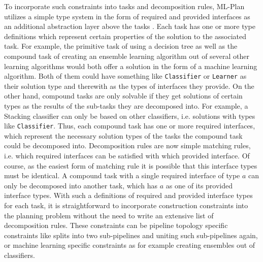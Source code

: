 To incorporate such constraints into tasks and decomposition rules, ML-Plan utilizes a simple type system in the form of required and provided interfaces as an additional abstraction layer above the tasks .
Each task has one or more type definitions which represent certain properties of the solution to the associated task.
For example, the primitive task of using a decision tree as well as the compound task of creating an ensemble learning algorithm out of several other learning algorithms would both offer a solution in the form of a machine learning algorithm.
Both of them could have something like \texttt{Classifier} or \texttt{Learner} as their solution type and therewith as the types of interfaces they provide.\newline
On the other hand, compound tasks are only solvable if they get solutions of certain types as the results of the sub-tasks they are decomposed into.
For example, a Stacking classifier can only be based on other classifiers, i.e. solutions with types like \texttt{Classifier}.
Thus, each compound task has one or more required interfaces, which represent the necessary solution types of the tasks the compound task could be decomposed into.\newline
Decomposition rules are now simple matching rules, i.e. which required interfaces can be satisfied with which provided interface.
Of course, as the easiest form of matching rule it is possible that this interface types must be identical.
A compound task with a single required interface of type $a$ can only be decomposed into another task, which has $a$ as one of its provided interface types.
With such a definitions of required and provided interface types for each task, it is straightforward to incorporate construction constraints into the planning problem without the need to write an extensive list of decomposition rules.
These constraints can be pipeline topology specific constraints like splits into two sub-pipelines and uniting such sub-pipelines again, or machine learning specific constraints as for example creating ensembles out of classifiers.

